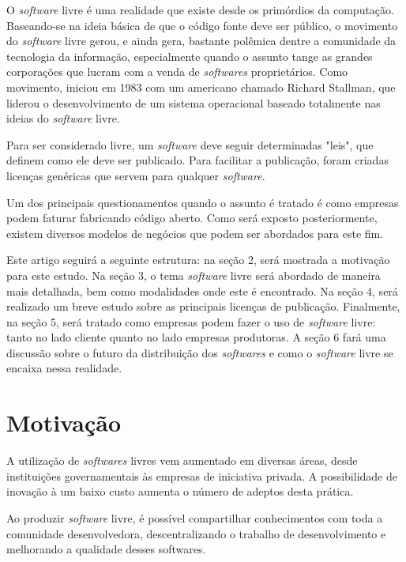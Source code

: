 \documentclass{classe_cn}                 %
\begin{document}
O \textit{software} livre é uma realidade que existe desde os primórdios da computação. Baseando-se na ideia básica de que o código fonte deve ser público, o movimento do \textit{software} livre gerou, e ainda gera, bastante polêmica dentre a comunidade da tecnologia da informação, especialmente quando o assunto tange as grandes corporações que lucram com a venda de \textit{softwares} proprietários. Como movimento, iniciou em 1983 \cite{Campos:2016} com um americano chamado Richard Stallman, que liderou o desenvolvimento de um sistema operacional baseado totalmente nas ideias do \textit{software} livre.

Para ser considerado livre, um \textit{software} deve seguir determinadas "leis", que definem como ele deve ser publicado. Para facilitar a publicação, foram criadas licenças genéricas que servem para qualquer \textit{software}.

Um dos principais questionamentos quando o assunto é tratado é como empresas podem faturar fabricando código aberto. Como será exposto posteriormente, existem diversos modelos de negócios que podem ser abordados para este fim.

Este artigo seguirá a seguinte estrutura: na seção 2, será mostrada a motivação para este estudo. Na seção 3, o tema \textit{software} livre será abordado de maneira mais detalhada, bem como modalidades onde este é encontrado. Na seção 4, será realizado um breve estudo sobre as principais licenças de publicação. Finalmente, na seção 5, será tratado como empresas podem fazer o uso de \textit{software} livre: tanto no lado cliente quanto no lado empresas produtoras. A seção 6 fará uma discussão sobre o futuro da distribuição dos \textit{softwares} e como o \textit{software} livre se encaixa nessa realidade.


\section{Motivação}

A utilização de \textit{softwares} livres vem aumentado em diversas áreas, desde instituições governamentais às empresas de iniciativa privada. A possibilidade de inovação à um baixo custo aumenta o número de adeptos desta prática.

Ao produzir \textit{software} livre, é possível compartilhar conhecimentos com toda a comunidade desenvolvedora, descentralizando o trabalho de desenvolvimento e melhorando a qualidade desses softwares.
\end{document}
